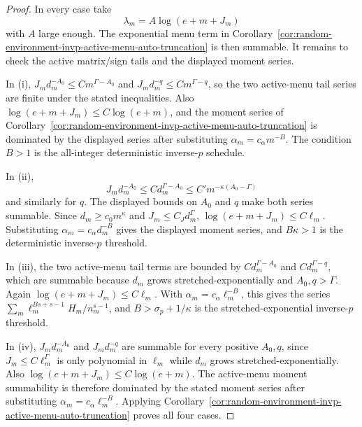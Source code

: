 \documentclass[11pt]{amsart}
\numberwithin{equation}{section}
\theoremstyle{definition}
\theoremstyle{remark}
\begin{document}
\begin{proof}
In every case take
\[
  \lambda_m=A\log(e+m+J_m)
\]
with \(A\) large enough.  The exponential menu term in
Corollary~\ref{cor:random-environment-invp-active-menu-auto-truncation} is then
summable.  It remains to check the active matrix/sign tails and the displayed
moment series.

In \textup{(i)}, \(J_md_m^{-A_0}\le C m^{\Gamma-A_0}\) and
\(J_md_m^{-q}\le C m^{\Gamma-q}\), so the two active-menu tail series are
finite under the stated inequalities.  Also
\(\log(e+m+J_m)\le C\log(e+m)\), and the moment series of
Corollary~\ref{cor:random-environment-invp-active-menu-auto-truncation} is
dominated by the displayed series after substituting
\(\alpha_m=c_\alpha m^{-B}\).  The condition \(B>1\) is the all-integer
deterministic inverse-\(p\) schedule.

In \textup{(ii)},
\[
  J_md_m^{-A_0}\le C d_m^{\Gamma-A_0}
  \le C' m^{-\kappa(A_0-\Gamma)}
\]
and similarly for \(q\).  The displayed bounds on \(A_0\) and \(q\) make both
series summable.  Since \(d_m\ge c_0m^\kappa\) and \(J_m\le C_Jd_m^\Gamma\),
\(\log(e+m+J_m)\le C\ell_m\).  Substituting
\(\alpha_m=c_\alpha d_m^{-B}\) gives the displayed moment series, and
\(B\kappa>1\) is the deterministic inverse-\(p\) threshold.

In \textup{(iii)}, the two active-menu tail terms are bounded by
\(C d_m^{\Gamma-A_0}\) and \(C d_m^{\Gamma-q}\), which are summable because
\(d_m\) grows stretched-exponentially and \(A_0,q>\Gamma\).  Again
\(\log(e+m+J_m)\le C\ell_m\).  With
\(\alpha_m=c_\alpha\ell_m^{-B}\), this gives the series
\(\sum_m \ell_m^{Bs+s-1}H_m/n_m^{s-1}\), and
\(B>\sigma_p+1/\kappa\) is the stretched-exponential inverse-\(p\) threshold.

In \textup{(iv)}, \(J_m d_m^{-A_0}\) and \(J_m d_m^{-q}\) are summable for every
positive \(A_0,q\), since \(J_m\le C\ell_m^\Gamma\) is only polynomial in
\(\ell_m\) while \(d_m\) grows stretched-exponentially.  Also
\(\log(e+m+J_m)\le C\log(e+m)\).  The active-menu moment summability is
therefore dominated by the stated moment series after substituting
\(\alpha_m=c_\alpha\ell_m^{-B}\).  Applying
Corollary~\ref{cor:random-environment-invp-active-menu-auto-truncation} proves
all four cases.
\end{proof}
\end{document}
